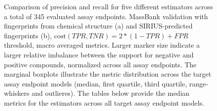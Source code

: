 \begin{figure}[htbp]
\begin{subfigure}[b]{0.495\textwidth}
      \caption{}
      \label{fig:hitcall_classification_Feature_Selection_XGBClassifier_mb_val_sirius_optimal_macro_avg}
  \end{subfigure}
  \caption{Comparison of precision and recall for five different estimators across a total of 345 evaluated assay endpoints. MassBank validation with fingerprints from chemical structure (a) and SIRIUS-predicted fingerprints (b), $\text{cost}(TPR, TNR) = 2 * (1 - TPR) + FPR$ threshold, macro averaged metrics. Larger marker size indicate a larger relative imbalance between the support for negative and positive compounds, normalized across all assay endpoints. The marginal boxplots illustrate the metric distribution across the target assay endpoint models (median, first quartile, third quartile, range-whiskers and outlieres). The tables below provide the median metrics for the estimators across all target assay endpoint models.}
  \label{fig:hitcall_classification_Feature_Selection_XGBClassifier_mb_val_optimal_macro_avg}
\end{figure}



\newpage

